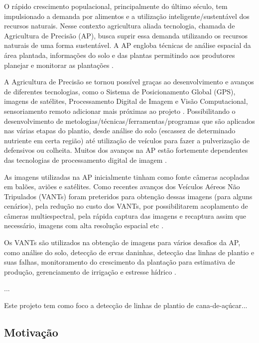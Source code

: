 \documentclass[12pt, a4paper, english, brazil]{article}
\newcommand{\textRed}[1]{{{\color{red} #1 }}}
\begin{document}
O rápido crescimento populacional, principalmente do último século, tem impulsionado a demanda por alimentos e a utilização inteligente/sustentável dos recursos naturais. Nesse contexto agricultura aliada tecnologia, chamada de Agricultura de Precisão (AP), busca suprir essa demanda utilizando os recursos naturais de uma forma sustentável. A AP engloba técnicas de análise espacial da área plantada, informações do solo e das plantas permitindo aos produtores planejar e monitorar as plantações \cite{Blasch_2020}.

A Agricultura de Precisão se tornou possível graças ao desenvolvimento e avanços de diferentes tecnologias, como o Sistema de Posicionamento Global (GPS), imagens de satélites, Processamento Digital de Imagem e Visão Computacional, sensoriamento remoto \textRed{adicionar mais próximas ao projeto}. Possibilitando o desenvolvimento de metologias/técnicas/ferramentas/programas que são aplicados nas várias etapas do plantio, desde análise do solo (escassez de determinado nutriente em certa região) até utilização de veículos para fazer a pulverização de defensivos ou colheita. \textRed{Muitos dos avanços na AP estão fortemente dependentes das tecnologias de processamento digital de imagem} \cite{Bolfe_2020}.

As imagens utilizadas na AP inicialmente tinham como fonte câmeras acopladas em balões, aviões e satélites. Como recentes avanços dos Veículos Aéreos Não Tripulados (VANTs) foram preteridos para obtenção dessas imagens (para alguns cenários), pela redução no custo dos VANTs, por possibilitarem acoplamento de câmeras multiespectral, pela rápida captura das imagens e recaptura assim que necessário, imagens com alta resolução espacial etc \textRed{\cite{Delavarpour_2021}}.

Os VANTs são utilizados na obtenção de imagens para vários desafios da AP, como análise do solo, detecção de ervas daninhas, detecção das linhas de plantio e suas falhas, monitoramento do crescimento da plantação para estimativa de produção, gerenciamento de irrigação e estresse hídrico \textRed{\cite{Delavarpour_2021}}.

...

Este projeto tem como foco a detecção de linhas de plantio de cana-de-açúcar...

\subsection{Motivação}
\end{document}
